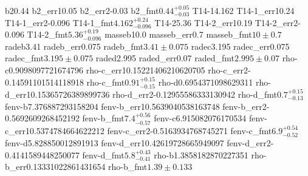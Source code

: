 {{{b2}{0.44}%
{b2_err1}{0.05}%
{b2_err2}{-0.03}%
{b2_fmt}{$0.44^{+0.05}_{-0.03}$}%
{T14-1}{4.162}%
{T14-1_err1}{0.24}%
{T14-1_err2}{-0.096}%
{T14-1_fmt}{$4.162^{+0.24}_{-0.096}$}%
{T14-2}{5.36}%
{T14-2_err1}{0.19}%
{T14-2_err2}{-0.096}%
{T14-2_fmt}{$5.36^{+0.19}_{-0.096}$}%
{masseb}{10.0}%
{masseb_err}{0.7}%
{masseb_fmt}{$10 \pm 0.7$}%
{radeb}{3.41}%
{radeb_err}{0.075}%
{radeb_fmt}{$3.41 \pm 0.075$}%
{radec}{3.195}%
{radec_err}{0.075}%
{radec_fmt}{$3.195 \pm 0.075$}%
{raded}{2.995}%
{raded_err}{0.07}%
{raded_fmt}{$2.995 \pm 0.07$}%
{rho-c}{0.9098097721674796}%
{rho-c_err1}{0.15221406210620705}%
{rho-c_err2}{-0.14591101514118918}%
{rho-c_fmt}{$0.91^{+0.15}_{-0.15}$}%
{rho-d}{0.6954371098629311}%
{rho-d_err1}{0.15365726389899736}%
{rho-d_err2}{-0.12955586333130942}%
{rho-d_fmt}{$0.7^{+0.15}_{-0.13}$}%
{fenv-b}{7.376887293158204}%
{fenv-b_err1}{0.5639040538163748}%
{fenv-b_err2}{-0.5692609268452192}%
{fenv-b_fmt}{$7.4^{+0.56}_{-0.57}$}%
{fenv-c}{6.915082076170534}%
{fenv-c_err1}{0.5374784664622212}%
{fenv-c_err2}{-0.5163934768745271}%
{fenv-c_fmt}{$6.9^{+0.54}_{-0.52}$}%
{fenv-d}{5.828850012891913}%
{fenv-d_err1}{0.42619728665949097}%
{fenv-d_err2}{-0.4141589448250077}%
{fenv-d_fmt}{$5.8^{+0.43}_{-0.41}$}%
{rho-b}{1.3858182870227351}%
{rho-b_err}{0.13331022861431654}%
{rho-b_fmt}{$1.39 \pm 0.133$}%
}%
}